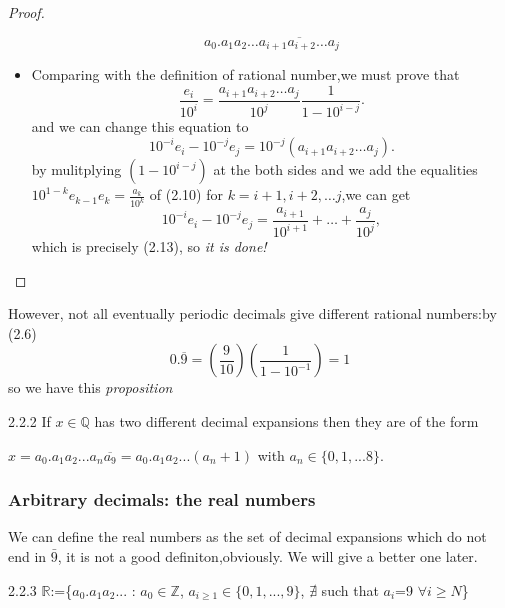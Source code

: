 \documentclass[a4paper]{article}
\begin{document}
\begin{proof}
\begin{itemize}
\begin{equation}
                a_0.a_1a_2\ldots \overline{a_{i+1}a_{i+2}\ldots  a_j} \tag{2.12}
            \end{equation}
        \item Comparing with the definition of rational number,we must prove that
            \begin{equation*}
                \frac{e_i}{10^i}=\frac{a_{i+1}a_{i+2}\ldots a_j}{10^j}\frac{1}{1-10^{i-j}}.
            \end{equation*}
            and we can change this equation to 
            \begin{equation}
                10^{-i}e_i-10^{-j}e_j=10^{-j}(a_{i+1}a_{i+2}\ldots a_j).\tag{2.13}
            \end{equation}
            by mulitplying $(1-10^{i-j})$ at the both sides and we add the equalities $10^{1-k}e_{k-1}e_k=\frac{a_k}{10^k}$ of (2.10) for $k=i+1,i+2,\ldots j$,we can get
            \begin{equation*}
                10^{-i}e_i-10^{-j}e_j=\frac{a_{i+1}}{10^{i+1}}+\ldots+\frac{a_j}{10^j},
            \end{equation*}
            which is precisely (2.13), so \textit{it is done!}
    \end{itemize}
\end{proof}
    However, not all eventually periodic decimals give different rational numbers:by (2.6)
    \begin{equation*}
        0.\overline{9}=\left(\frac{9}{10}\right)\left(\frac{1}{1-10^{-1}}\right)=1
    \end{equation*}
    so we have this \textit{proposition}
\begin{proposition}{2.2.2}{}
    If $x\in \mathbb{Q}$ has two different decimal expansions then they are of the form 
    \begin{center}
        $x=a_0.a_1a_2...a_n \overline{a_9}=a_0.a_1a_2...(a_n+1)$ with $a_n\in \{0,1,...8\}$.
    \end{center}
\end{proposition}
\subsubsection{Arbitrary decimals: the real numbers}
We can define the real numbers as the set of decimal expansions which do not end in $\bar{9}$, it is not a good definiton,obviously. We will give a better one later.
\begin{definition}{2.2.3}{}
    $\mathbb{R}$:=\{$a_0.a_1a_2...$ : $a_0\in \mathbb{Z}$, $a_{i \geq 1}\in \{0,1,...,9\}$, $\nexists $ such that $a_i$=9 $\forall i \geq N$\}
\end{definition}
\end{document}
